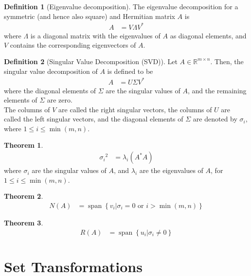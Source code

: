\documentclass[titlepage, fleqn, a4paper, 12pt, twoside]{article}
\theoremstyle{definition}
\newtheorem{definition}{Definition}
\theoremstyle{theorem}
\newtheorem{theorem}{Theorem}
\DeclareMathOperator{\vspan}{\mathrm{span}}
\begin{document}
\begin{definition}[Eigenvalue decomposition]
	The eigenvalue decomposition for a symmetric (and hence also square) and Hermitian matrix $A$ is
	\begin{align*}
		A &= V \Lambda V^*
	\end{align*}
	where $\Lambda$ is a diagonal matrix with the eigenvalues of $A$ as diagonal elements, and $V$ contains the corresponding eigenvectors of $A$.
\end{definition}

\begin{definition}[Singular Value Decomposition (SVD)]
	Let $A \in \mathbb{R}^{m \times n}$.
	Then, the singular value decomposition of $A$ is defined to be
	\begin{align*}
		A &= U \Sigma V^*
	\end{align*}
	where the diagonal elements of $\Sigma$ are the singular values of $A$, and the remaining elements of $\Sigma$ are zero.\\
	The columns of $V$ are called the right singular vectors, the columns of $U$ are called the left singular vectors, and the diagonal elements of $\Sigma$ are denoted by $\sigma_i$, where $1 \le i \le \min(m,n)$.
\end{definition}

\begin{theorem}
	\begin{align*}
		{\sigma_i}^2 &= \lambda_i \left( A^* A \right)
	\end{align*}
	where $\sigma_i$ are the singular values of $A$, and $\lambda_i$ are the eigenvalues of $A$, for $1 \le i \le \min(m,n)$.
\end{theorem}

\begin{theorem}
	\begin{align*}
		N(A) &= \vspan\left\{ v_i \Big| \sigma_i = 0 \text{ or } i > \min(m,n) \right\}
	\end{align*}
\end{theorem}

\begin{theorem}
	\begin{align*}
		R(A) &= \vspan\left\{ u_i \Big| \sigma_i \neq 0 \right\}
	\end{align*}
\end{theorem}

\section{Set Transformations}
\end{document}
